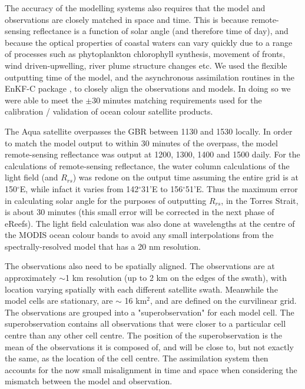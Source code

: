 The accuracy of the modelling systems also requires that the model and observations are closely
matched in space and time. This is because remote-sensing reflectance is a function of solar angle
(and therefore time of day), and because the optical properties of coastal waters can vary quickly
due to a range of processes such as phytoplankton chlorophyll synthesis, movement of fronts, wind
driven-upwelling, river plume structure changes etc. We used the flexible outputting time of the
model, and the asynchronous assimilation routines in the EnKF-C package \citep{Sakov17}, to closely
align the observations and models. In doing so we were able to meet the $\pm 30$ minutes matching
requirements used for the calibration / validation of ocean colour satellite products.

The Aqua satellite overpasses the GBR between 1130 and 1530 locally. In order to match the model
output to within 30 minutes of the overpass, the model remote-sensing reflectance was output at
1200, 1300, 1400 and 1500 daily. For the calculations of remote-sensing reflectance, the water
column calculations of the light field (and $R_{rs}$) was redone on the output time assuming the
entire grid is at 150$^{\circ}$E, while infact it varies from 142$^{\circ}$31'E to
156$^{\circ}$51'E. Thus the maximum error in calculating solar angle for the purposes of outputting
$R_{rs}$, in the Torres Strait, is about 30 minutes (this small error will be corrected in the next
phase of eReefs). The light field calculation was also done at wavelengths at the centre of the
MODIS ocean colour bands to avoid any small interpolations from the spectrally-resolved model that
has a 20 nm resolution.

The observations also need to be spatially aligned. The observations are at approximately $\sim$1 km
resolution (up to 2 km on the edges of the swath), with location varying spatially with each
different satellite swath. Meanwhile the model cells are stationary, are $\sim$ 16 km$^2$, and are
defined on the curvilinear grid. The observations are grouped into a "superobservation" for each
model cell. The superobservation contains all observations that were closer to a particular cell
centre than any other cell centre. The position of the superobservation is the mean of the
observations it is composed of, and will be close to, but not exactly the same, as the location of
the cell centre. The assimilation system then accounts for the now small misalignment in time and
space when considering the mismatch between the model and observation.

